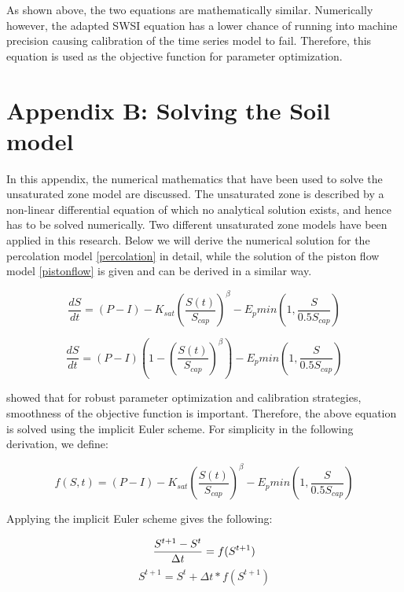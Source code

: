 As shown above, the two equations are mathematically similar. Numerically however, the adapted SWSI equation has a lower chance of running into machine precision causing calibration of the time series model to fail. Therefore, this equation is used as the objective function for parameter optimization. 


%
%


\section{Appendix B: Solving the Soil model}
In this appendix, the numerical mathematics that have been used to solve the unsaturated zone model are discussed. The unsaturated zone is described by a non-linear differential equation of which no analytical solution exists, and hence has to be solved numerically. Two different unsaturated zone models have been applied in this research. Below we will derive the numerical solution for the percolation model \eqref{percolation} in detail, while the solution of the piston flow model \eqref{pistonflow} is given and can be derived in a similar way.

\begin{equation} \label{percolation}
\frac{dS}{dt} = (P-I)- K_{sat}\left( \frac{S(t)}{S_{cap}}\right) ^\beta - E_p min(1, \frac{S}{0.5S_{cap}})
\end{equation}

\begin{equation} \label{pistonflow}
\frac{dS}{dt} = (P-I)(1-\left( \frac{S(t)}{S_{cap}}\right) ^\beta) - E_p min(1, \frac{S}{0.5S_{cap}})
\end{equation}

\citet{kavetski_calibration_2006-1} showed that for robust parameter optimization and calibration strategies, smoothness of the objective function is important. Therefore, the above equation is solved using the implicit Euler scheme. For simplicity in the following derivation, we define:

\begin{equation}
f(S,t) = (P-I)- K_{sat}\left( \frac{S(t)}{S_{cap}}\right) ^\beta - E_p min(1, \frac{S}{0.5S_{cap}})
\end{equation}

Applying the implicit Euler scheme gives the following:

\begin{equation}
\frac{S^{t+1}-S^t}{\Delta{t}} = f(S^{t+1})\\
\end{equation}
\begin{equation} \label{impeuler}
S^{t+1} = S^t + \Delta{t} * f(S^{t+1})
\end{equation}


